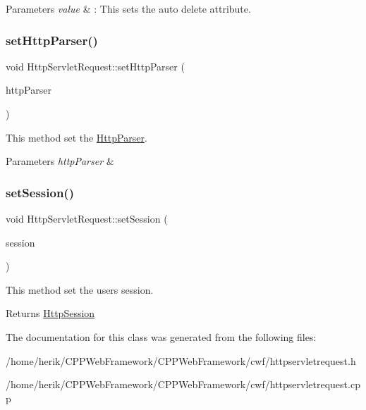\begin{DoxyParams}{Parameters}
{\em value} & \+: This sets the auto delete attribute. \\
\hline
\end{DoxyParams}
\mbox{\label{class_http_servlet_request_ab7bf2b4dc9f9335ce747e9dc2221e018}} 
\subsubsection{\texorpdfstring{set\+Http\+Parser()}{setHttpParser()}}
{\footnotesize\ttfamily void Http\+Servlet\+Request\+::set\+Http\+Parser (\begin{DoxyParamCaption}\item[{\hyperlink{class_http_parser}{Http\+Parser} \&}]{http\+Parser }\end{DoxyParamCaption})\hspace{0.3cm}{\ttfamily [inline]}}



This method set the \hyperlink{class_http_parser}{Http\+Parser}. 


\begin{DoxyParams}{Parameters}
{\em http\+Parser} & \\
\hline
\end{DoxyParams}
\mbox{\label{class_http_servlet_request_a52143e9c7db683d28ca9763d4357308a}} 
\subsubsection{\texorpdfstring{set\+Session()}{setSession()}}
{\footnotesize\ttfamily void Http\+Servlet\+Request\+::set\+Session (\begin{DoxyParamCaption}\item[{\hyperlink{class_http_session}{Http\+Session} \&}]{session }\end{DoxyParamCaption})\hspace{0.3cm}{\ttfamily [inline]}}



This method set the user\textquotesingle{}s session. 

\begin{DoxyReturn}{Returns}
\hyperlink{class_http_session}{Http\+Session} 
\end{DoxyReturn}


The documentation for this class was generated from the following files\+:\begin{DoxyCompactItemize}
\item 
/home/herik/\+C\+P\+P\+Web\+Framework/\+C\+P\+P\+Web\+Framework/cwf/httpservletrequest.\+h\item 
/home/herik/\+C\+P\+P\+Web\+Framework/\+C\+P\+P\+Web\+Framework/cwf/httpservletrequest.\+cpp\end{DoxyCompactItemize}
